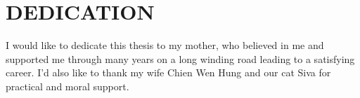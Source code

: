 \chapter*{DEDICATION}

I would like to dedicate this thesis to my mother, who believed in me and supported me through many years on a long winding road leading to a satisfying career.  I'd also like to thank my wife Chien Wen Hung and our cat Siva for practical and moral support.
